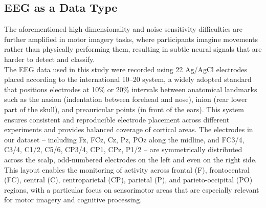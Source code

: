 \subsection{EEG as a Data Type}
The aforementioned high dimensionality and noise sensitivity difficulties are further amplified in motor imagery tasks, where participants imagine movements rather than physically performing them, resulting in subtle neural signals that are harder to detect and classify.
\vspace{0.5em}\\
The EEG data used in this study were recorded using 22 Ag/AgCl electrodes placed according to the international 10–20 system, a widely adopted standard that positions electrodes at 10\% or 20\% intervals between anatomical landmarks such as the nasion (indentation between forehead and nose), inion (rear lower part of the skull), and preauricular points (in front of the ears). This system ensures consistent and reproducible electrode placement across different experiments and provides balanced coverage of cortical areas. The electrodes in our dataset – including Fz, FCz, Cz, Pz, POz along the midline, and FC3/4, C3/4, C1/2, C5/6, CP3/4, CP1, CPz, P1/2  – are symmetrically distributed across the scalp, odd-numbered electrodes on the left and even on the right side. This layout enables the monitoring of activity across frontal (F), frontocentral (FC), central (C), centroparietal (CP), parietal (P), and parieto-occipital (PO) regions, with a particular focus on sensorimotor areas that are especially relevant for motor imagery and cognitive processing.
